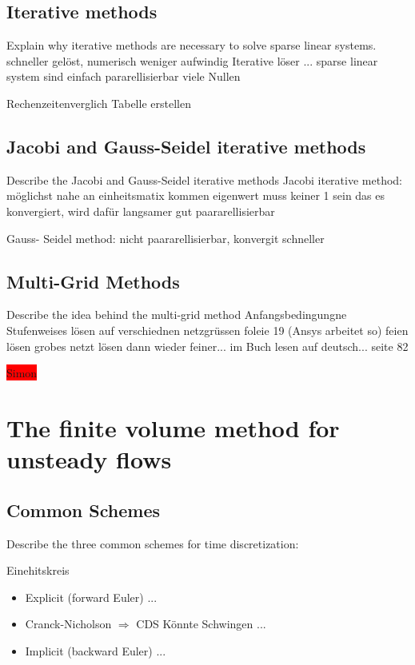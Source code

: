 \documentclass[a4paper]{scrartcl}
\begin{document}
\subsection{Iterative methods} 
Explain why iterative methods are necessary to
solve sparse linear systems.
schneller gelöst, numerisch weniger aufwindig
Iterative löser ...
sparse linear system sind einfach pararellisierbar viele Nullen

Rechenzeitenverglich Tabelle erstellen

\subsection{Jacobi and Gauss-Seidel iterative methods}
Describe the Jacobi and Gauss-Seidel iterative methods
Jacobi iterative method: 
möglichst nahe an einheitsmatix kommen
eigenwert muss keiner 1 sein das es konvergiert, wird dafür langsamer 
gut paararellisierbar

Gauss- Seidel method: 
nicht paararellisierbar, konvergit schneller

\subsection{Multi-Grid Methods} 
Describe the idea behind the multi-grid method
Anfangsbedingungne 
Stufenweises lösen auf verschiednen netzgrüssen
foleie 19 (Ansys arbeitet so)
feien lösen
grobes netzt lösen
dann wieder feiner...
im Buch lesen auf deutsch... seite 82

\colorbox{red}{Simon}

\section{The finite volume method for unsteady flows}
\subsection{Common Schemes} Describe the three common schemes for time
discretization:

Einehitskreis 
\begin{itemize}
\item Explicit (forward Euler)
...

\item Cranck-Nicholson $\Rightarrow$ CDS
Könnte Schwingen
...

\item Implicit (backward Euler)
...

\end{itemize}
\end{document}
